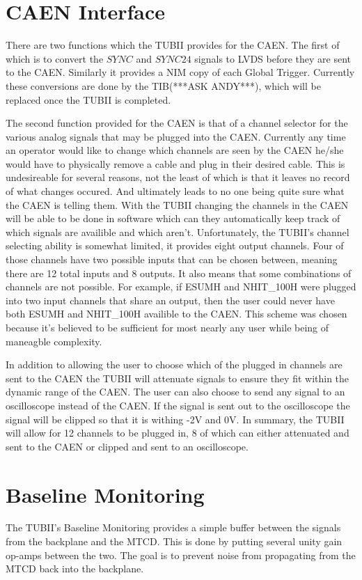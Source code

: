 \documentclass[11pt,a4paper]{article}
\begin{document}
\section{CAEN Interface}
There are two functions which the TUBII provides for the CAEN. The first of which is to convert the $SYNC$ and $SYNC24$ signals to LVDS before they are sent to the CAEN. Similarly it provides a NIM copy of each Global Trigger. Currently these conversions are done by the TIB(***ASK ANDY***), which will be replaced once the TUBII is completed. 

 The second function provided for the CAEN is that of a channel selector for the various analog signals that may be plugged into the CAEN. Currently any time an operator would like to change which channels are seen by the CAEN he/she would have to physically remove a cable and plug in their desired cable. This is undesireable for several reasons, not the least of which is that it leaves no record of what changes occured. And ultimately leads to no one being quite sure what the CAEN is telling them. With the TUBII changing the channels in the CAEN will be able to be done in software which can they automatically keep track of which signals are availible and which aren't. Unfortunately, the TUBII's channel selecting ability is somewhat limited, it provides eight output channels. Four of those channels have two possible inputs that can be chosen between, meaning there are 12 total inputs and 8 outputs. It also means that some combinations of channels are not possible. For example, if ESUMH and NHIT\_100H were plugged into two input channels that share an output, then the user could never have both ESUMH and NHIT\_100H availible to the CAEN. This scheme was chosen because it's believed to be sufficient for most nearly any user while being of maneagble complexity.
 
    In addition to allowing the user to choose which of the plugged in channels are sent to the CAEN the TUBII will attenuate signals to ensure they fit within the dynamic range of the CAEN. The user can also choose to send any signal to an oscilloscope instead of the CAEN. If the signal is sent out to the oscilloscope the signal will be clipped so that it is withing -2V and 0V. In summary, the TUBII will allow for 12 channels to be plugged in, 8 of which can either attenuated and sent to the CAEN or clipped and sent to an oscilloscope. 
\section{Baseline Monitoring}
The TUBII's Baseline Monitoring provides a simple buffer between the signals from the backplane and the MTCD. This is done by putting several unity gain op-amps between the two. The goal is to prevent noise from propagating from the MTCD back into the backplane. 
\end{document}
